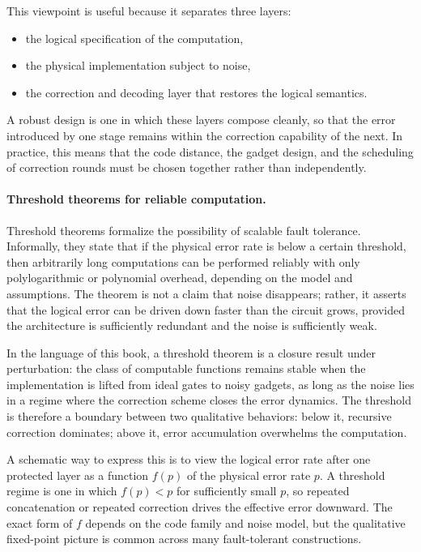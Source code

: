 \documentclass[11pt]{article}
\begin{document}
This viewpoint is useful because it separates three layers:
\begin{itemize}
  \item the logical specification of the computation,
  \item the physical implementation subject to noise,
  \item the correction and decoding layer that restores the logical semantics.
\end{itemize}
A robust design is one in which these layers compose cleanly, so that the error introduced by one stage remains within the correction capability of the next. In practice, this means that the code distance, the gadget design, and the scheduling of correction rounds must be chosen together rather than independently.

\paragraph{Threshold theorems for reliable computation.}
Threshold theorems formalize the possibility of scalable fault tolerance. Informally, they state that if the physical error rate is below a certain threshold, then arbitrarily long computations can be performed reliably with only polylogarithmic or polynomial overhead, depending on the model and assumptions. The theorem is not a claim that noise disappears; rather, it asserts that the logical error can be driven down faster than the circuit grows, provided the architecture is sufficiently redundant and the noise is sufficiently weak.

In the language of this book, a threshold theorem is a closure result under perturbation: the class of computable functions remains stable when the implementation is lifted from ideal gates to noisy gadgets, as long as the noise lies in a regime where the correction scheme closes the error dynamics. The threshold is therefore a boundary between two qualitative behaviors: below it, recursive correction dominates; above it, error accumulation overwhelms the computation.

A schematic way to express this is to view the logical error rate after one protected layer as a function \(f(p)\) of the physical error rate \(p\). A threshold regime is one in which \(f(p) < p\) for sufficiently small \(p\), so repeated concatenation or repeated correction drives the effective error downward. The exact form of \(f\) depends on the code family and noise model, but the qualitative fixed-point picture is common across many fault-tolerant constructions.
\end{document}

